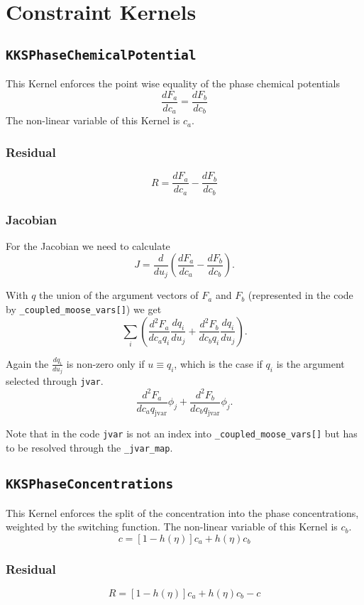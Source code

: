 \documentclass[]{article}
\begin{document}
\section{Constraint Kernels}

\subsection{\texttt{KKSPhaseChemicalPotential}}

This Kernel enforces the point wise equality of the phase chemical potentials
\[
\frac{dF_a}{dc_a}=\frac{dF_b}{dc_b}
\]
The non-linear variable of this Kernel is $c_a$.

\subsubsection{Residual}
\[
R=\frac{dF_a}{dc_a} - \frac{dF_b}{dc_b}
\]

\subsubsection{Jacobian}

For the Jacobian we need to calculate 
\[
J=\frac d{du_j}\left( \frac{dF_a}{dc_a} - \frac{dF_b}{dc_b} \right).
\]

With $q$ the union of the argument vectors of $F_a$ and $F_b$ (represented in the code by \texttt{\_coupled\_moose\_vars[]}) we get
\[
\sum_i \left( \frac{d^2F_a}{dc_aq_i}\frac{dq_i}{du_j} + \frac{d^2F_b}{dc_bq_i}\frac{dq_i}{du_j} \right).
\]

Again the $\frac{dq_i}{du_j}$ is non-zero only if $u\equiv q_i$, which is the case if $q_i$ is the argument selected through \texttt{jvar}.
\[
\frac{d^2F_a}{dc_aq_\text{jvar}}\phi_j + \frac{d^2F_b}{dc_bq_\text{jvar}}\phi_j.
\]

Note that in the code \texttt{jvar} is not an index into \texttt{\_coupled\_moose\_vars[]} but has to be resolved through the \texttt{\_jvar\_map}.

\subsection{\texttt{KKSPhaseConcentrations}}
This Kernel enforces the split of the concentration into the phase concentrations, weighted by the switching function. The non-linear variable of this Kernel is $c_b$.
\[
c = [1-h(\eta)]c_a+h(\eta)c_b
\]

\subsubsection{Residual}
\[
R=[1-h(\eta)]c_a + h(\eta)c_b - c
\]
\end{document}
